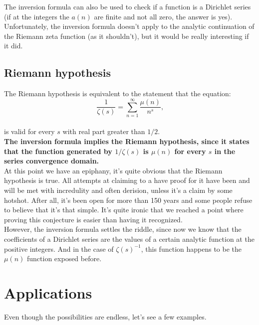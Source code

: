 \documentclass[12pt]{article}
\begin{document}
The inversion formula can also be used to check if a function is a Dirichlet series (if at the integers the $a(n)$ are finite and not all zero, the answer is yes).\\

Unfortunately, the inversion formula doesn't apply to the analytic continuation of the Riemann zeta function (as it shouldn't), but it would be really interesting if it did.

\subsection{Riemann hypothesis}
The Riemann hypothesis is equivalent to the statement that the equation:
\begin{equation} \nonumber 
\frac{1}{\zeta(s)}=\sum_{n=1}^{\infty}\frac{\mu(n)}{n^{s}} \text{,}
\end{equation}\\
\noindent is valid for every $s$ with real part greater than $1/2$.\\

\textbf{The inversion formula implies the Riemann hypothesis, since it states that the function generated by $1/\zeta(s)$ is $\mu(n)$ for every $s$ in the series convergence domain.}\\

At this point we have an epiphany, it's quite obvious that the Riemann hypothesis is true. All attempts at claiming to a have proof for it have been and will be met with incredulity and often derision, unless it's a claim by some hotshot. After all, it's been open for more than 150 years and some people refuse to believe that it's that simple. It's quite ironic that we reached a point where proving this conjecture is easier than having it recognized.\\ 

However, the inversion formula settles the riddle, since now we know that the coefficients of a Dirichlet series are the values of a certain analytic function at the positive integers. And in the case of $\zeta(s)^{-1}$, this function happens to be the $\mu(n)$ function exposed before.

\section{Applications}
Even though the possibilities are endless, let's see a few examples.

\end{document}
